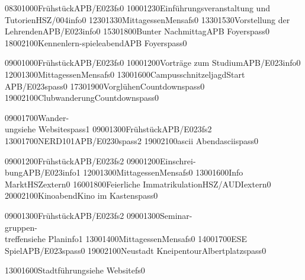 \documentclass[a5paper,7pt]{scrreprt}
\begin{document}
\begin{center}
\begin{timetable}
   {0830}{1000}{Frühstück}{}{APB/E023}{}{fs}{0}
   {1000}{1230}{Einführungsveranstaltung und Tutorien}{}{HSZ/004}{}{info}{0}
   {1230}{1330}{Mittagessen}{}{Mensa}{}{fs}{0}
   {1330}{1530}{Vorstellung der Lehrenden}{}{APB/E023}{}{info}{0}
   {1530}{1800}{Bunter Nachmittag}{}{APB Foyer}{}{spass}{0}
   {1800}{2100}{Kennenlern-spieleabend}{}{APB Foyer}{}{spass}{0}

   {0900}{1000}{Frühstück}{}{APB/E023}{}{fs}{0}
   {1000}{1200}{Vorträge zum Studium}{}{APB/E023}{}{info}{0}
   {1200}{1300}{Mittagessen}{}{Mensa}{}{fs}{0}
   {1300}{1600}{Campusschnitzeljagd}{}{Start APB/E023}{}{spass}{0}
   {1730}{1900}{Vorglühen}{}{Countdown}{}{spass}{0}
   {1900}{2100}{Clubwanderung}{}{Countdown}{}{spass}{0}

   {0900}{1700}{Wander-\\ung}{}{siehe Website}{}{spass}{1}
   {0900}{1300}{Frühstück}{}{APB/E023}{}{fs}{2}
   {1300}{1700}{NERD101}{}{APB/E023}{0}{spass}{2}
   {1900}{2100}{ascii Abend}{}{ascii}{}{spass}{0}

   {0900}{1200}{Frühstück}{}{APB/E023}{}{fs}{2}
   {0900}{1200}{Einschrei-\\bung}{}{APB/E023}{}{info}{1}
   {1200}{1300}{Mittagessen}{}{Mensa}{}{fs}{0}
   {1300}{1600}{Info Markt}{}{HSZ}{}{extern}{0}
   {1600}{1800}{Feierliche Immatrikulation}{}{HSZ/AUDI}{}{extern}{0}
   {2000}{2100}{Kinoabend}{}{Kino im Kasten}{}{spass}{0}
  
   {0900}{1300}{Frühstück}{}{APB/E023}{}{fs}{2}
   {0900}{1300}{Seminar-\\gruppen-\\treffen}{}{siehe Plan}{}{info}{1}
   {1300}{1400}{Mittagessen}{}{Mensa}{}{fs}{0}
   {1400}{1700}{ESE Spiel}{}{APB/E023}{}{spass}{0}
   {1900}{2100}{Neustadt Kneipentour}{}{Albertplatz}{}{spass}{0}
  
   {1300}{1600}{Stadtführung}{}{siehe Website}{}{fs}{0}
\end{timetable}
\end{center}
\end{document}
